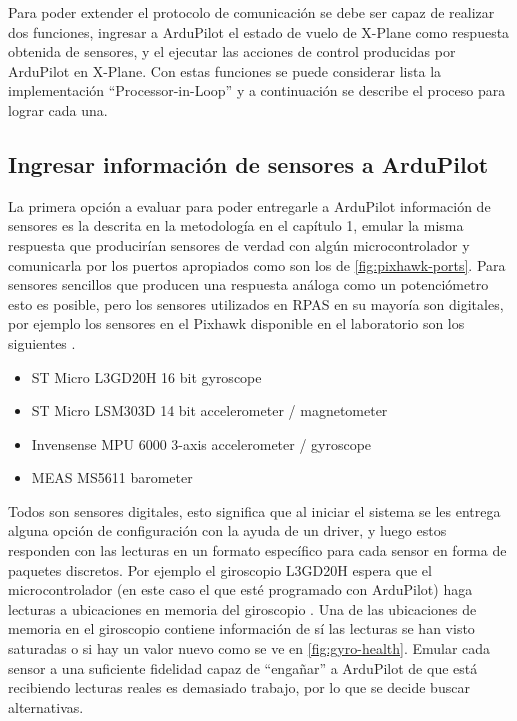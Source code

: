 Para poder extender el protocolo de comunicación se debe ser capaz de realizar dos funciones, ingresar a ArduPilot el estado de vuelo de X-Plane como respuesta obtenida de sensores, y el ejecutar las acciones de control producidas por ArduPilot en X-Plane. Con estas funciones se puede considerar lista la implementación ``Processor-in-Loop'' y a continuación se describe el proceso para lograr cada una.

\subsection{Ingresar información de sensores a ArduPilot}

La primera opción a evaluar para poder entregarle a ArduPilot información de sensores es la descrita en la metodología en el capítulo 1, emular la misma respuesta que producirían sensores de verdad con algún microcontrolador y comunicarla por los puertos apropiados como son los de \cref{fig:pixhawk-ports}. Para sensores sencillos que producen una respuesta análoga como un potenciómetro esto es posible, pero los sensores utilizados en RPAS en su mayoría son digitales, por ejemplo los sensores en el Pixhawk disponible en el laboratorio son los siguientes \cite{pixhawk1}.

\begin{itemize}
    \item ST Micro L3GD20H 16 bit gyroscope
    \item ST Micro LSM303D 14 bit accelerometer / magnetometer
    \item Invensense MPU 6000 3-axis accelerometer / gyroscope
    \item MEAS MS5611 barometer
\end{itemize}

Todos son sensores digitales, esto significa que al iniciar el sistema se les entrega alguna opción de configuración con la ayuda de un driver, y luego estos responden con las lecturas en un formato específico para cada sensor en forma de paquetes discretos. Por ejemplo el giroscopio L3GD20H espera que el microcontrolador (en este caso el que esté programado con ArduPilot) haga lecturas a ubicaciones en memoria del giroscopio \cite{gyro-datasheet}. Una de las ubicaciones de memoria en el giroscopio contiene información de sí las lecturas se han visto saturadas o si hay un valor nuevo como se ve en \cref{fig:gyro-health}. Emular cada sensor a una suficiente fidelidad capaz de ``engañar'' a ArduPilot de que está recibiendo lecturas reales es demasiado trabajo, por lo que se decide buscar alternativas.


